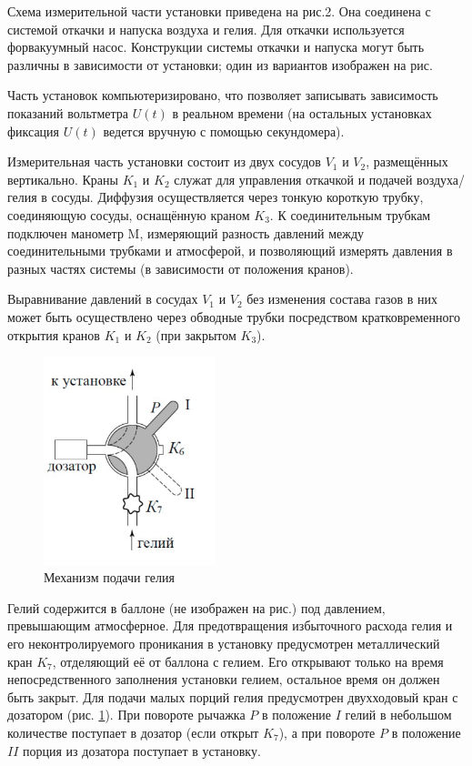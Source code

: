 \documentclass[12pt,a4paper]{article}
\begin{document}
Схема измерительной части установки приведена на рис.2. Она соединена с системой откачки и напуска воздуха и гелия. Для откачки используется форвакуумный насос. Конструкции системы откачки и напуска могут быть различны в зависимости от установки; один из вариантов изображен на рис.

Часть установок компьютеризировано, что позволяет записывать зависимость показаний вольтметра $ U(t) $ в реальном времени (на остальных установках фиксация $ U(t) $ ведется вручную с помощью секундомера).

Измерительная часть установки состоит из двух сосудов $ V_1 $ и $ V_2 $, размещённых вертикально. Краны $ K_1 $ и $ K_2 $ служат для управления откачкой и подачей воздуха/гелия в сосуды. Диффузия осуществляется через тонкую короткую трубку, соединяющую сосуды, оснащённую краном $ K_3 $. К соединительным трубкам подключен манометр M, измеряющий разность давлений между соединительными трубками и атмосферой, и позволяющий измерять давления в разных частях системы (в зависимости от положения кранов).

Выравнивание давлений в сосудах $ V_1 $ и $ V_2 $ без изменения состава газов в них может быть осуществлено через обводные трубки посредством кратковременного открытия кранов $ K_1 $ и $ K_2 $ (при закрытом $ K_3 $).

\begin{figure}
	\includegraphics[width=5cm]{2.2.1_4}
	\caption{Механизм подачи гелия}
	\label{ris4}
\end{figure}

Гелий содержится в баллоне (не изображен на рис.) под давлением, превышающим атмосферное. Для предотвращения избыточного расхода гелия и его неконтролируемого проникания в установку предусмотрен металлический кран $ K_7 $, отделяющий её от баллона с гелием. Его открывают только на время непосредственного заполнения установки гелием, остальное время он должен быть закрыт. Для подачи малых порций гелия предусмотрен двухходовый кран с дозатором (рис. \ref{ris4}). При повороте рычажка $ P $ в положение $ I $ гелий в небольшом количестве поступает в дозатор (если открыт $ K_7 $), а при повороте $ P $ в положение $ II $ порция из дозатора поступает в установку.
\end{document}
